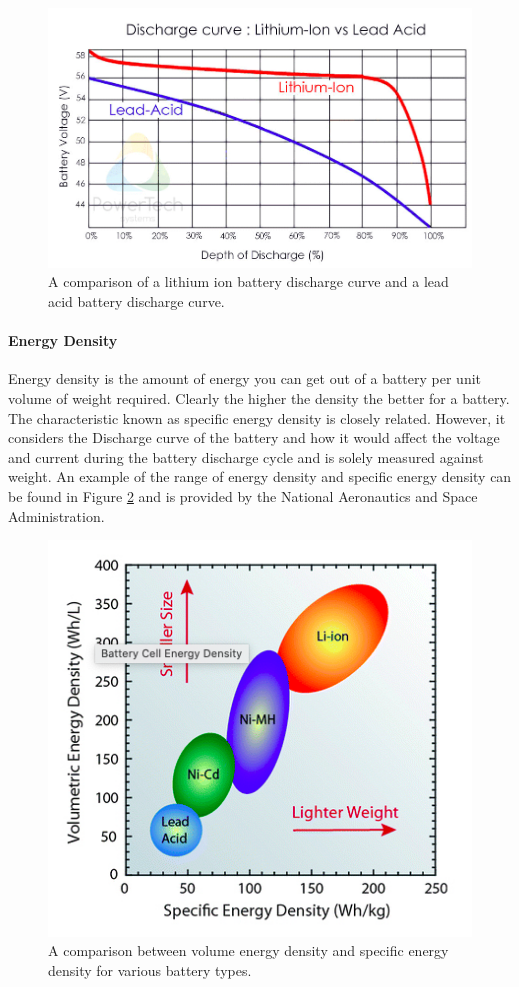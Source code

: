 \begin{figure}
    \centering
    \includegraphics[scale=0.4]{figures/discharge curve.png}
    \caption{A comparison of a lithium ion battery discharge curve and a lead acid battery discharge curve.}
    \label{fig:discharge-curve} 
\end{figure}

\paragraph{Energy Density}
Energy density is the amount of energy you can get out of a battery per unit volume of weight required. Clearly the higher the density the better for a battery. The characteristic known as specific energy density is closely related. However, it considers the Discharge curve of the battery and how it would affect the voltage and current during the battery discharge cycle and is solely measured against weight. An example of the range of energy density and specific energy density can be found in Figure \ref{fig:energy-density} and is provided by the National Aeronautics and Space Administration.

\begin{figure}
    \centering
    \includegraphics[scale=0.4]{figures/energy density.png}
    \caption{A comparison between volume energy density and specific energy density for various battery types.}
    \label{fig:energy-density} 
\end{figure}

